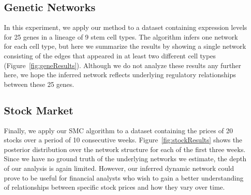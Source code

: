 \documentclass{article}
\begin{document}
\subsection{Genetic Networks}
In this experiment, we apply our method to a dataset containing expression levels for 25 genes in a lineage of 9 stem cell types. The algorithm infers one network for each cell type, but here we summarize the results by showing a single network consisting of the edges that appeared in at least two different cell types (Figure~\ref{fig:geneResults}). Although we do not analyze these results any further here, we hope the inferred network reflects underlying regulatory relationships between these 25 genes. %

\subsection{Stock Market}
Finally, we apply our SMC algorithm to a dataset containing the prices of 20 stocks over a period of 10 consecutive weeks. Figure~\ref{fig:stockResults} shows the posterior distribution over the network structure for each of the first three weeks. Since we have no ground truth of the underlying networks we estimate, the depth of our analysis is again limited. However, our inferred dynamic network could prove to be useful for financial analysts who wish to gain a better understanding of relationships between specific stock prices and how they vary over time. 



\end{document}
